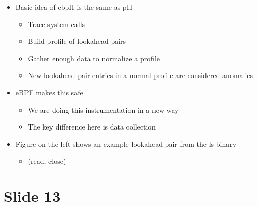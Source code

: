\documentclass[
  12pt]{findlay}
\providecommand{\tightlist}{\setlength{\itemsep}{0pt}\setlength{\parskip}{0pt}}
\begin{document}
\begin{itemize}
\tightlist
\item
  Basic idea of ebpH is the same as pH

  \begin{itemize}
  \tightlist
  \item
    Trace system calls
  \item
    Build profile of lookahead pairs
  \item
    Gather enough data to normalize a profile
  \item
    New lookahead pair entries in a normal profile are considered
    anomalies
  \end{itemize}
\item
  eBPF makes this safe

  \begin{itemize}
  \tightlist
  \item
    We are doing this instrumentation in a new way
  \item
    The key difference here is data collection
  \end{itemize}
\item
  Figure on the left shows an example lookahead pair from the ls binary

  \begin{itemize}
  \tightlist
  \item
    (read, close)
  \end{itemize}
\end{itemize}

\hypertarget{slide-13}{%
\section{Slide 13}\label{slide-13}}
\end{document}

